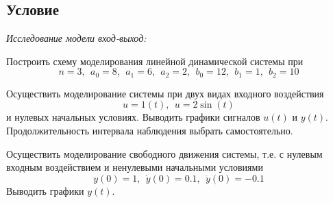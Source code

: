 \documentclass[a4paper, 12pt]{article}
\begin{document}
    \subsection{Условие}
    \textit{Исследование модели вход-выход:}
    \begin{compactitem}
    \item Построить схему моделирования линейной динамической системы при
    $$n=3,\ \ a_0=8,\ \ a_1=6,\ \ a_2=2,\ \ b_0=12,\ \ b_1=1,\ \ b_2=10$$
    \item Осуществить моделирование системы при двух видах входного воздействия
    $$u=1(t),\ \ u=2\sin{(t)}$$ и нулевых начальных условиях. Выводить графики
    сигналов $u(t)$ и $y(t)$. Продолжительность интервала наблюдения выбрать самостоятельно.
    \item Осуществить моделирование свободного движения системы, т.е. с нулевым входным
    воздействием и ненулевыми начальными условиями
    $$y(0)=1,\ \ \dot{y}(0)=0.1,\ \ \ddot{y}(0)=-0.1$$ Выводить графики $y(t)$.
    \end{compactitem}
\end{document}
